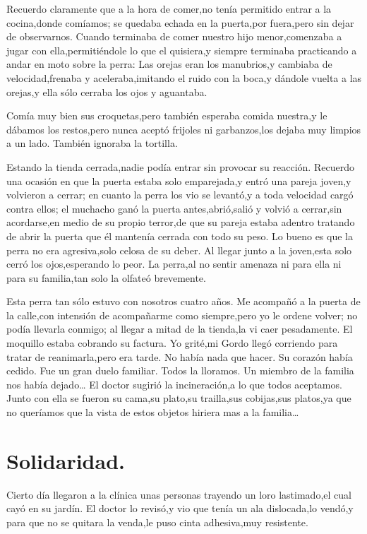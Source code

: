 \documentclass[letterpaper,12pt]{book}
\begin{document}
Recuerdo claramente que a la hora de comer,no tenía permitido entrar a la cocina,donde comíamos; se quedaba echada en la puerta,por fuera,pero sin dejar de observarnos. Cuando terminaba de comer nuestro hijo menor,comenzaba a jugar con ella,permitiéndole lo que el quisiera,y siempre terminaba practicando a andar en moto sobre la perra: Las orejas eran los manubrios,y cambiaba de velocidad,frenaba y aceleraba,imitando el ruido con la boca,y dándole vuelta a las orejas,y ella sólo cerraba los ojos y aguantaba.

Comía muy bien sus croquetas,pero también esperaba comida nuestra,y le dábamos los restos,pero nunca aceptó frijoles ni garbanzos,los dejaba muy limpios a un lado. También ignoraba la tortilla.

Estando la tienda cerrada,nadie podía entrar sin provocar su reacción. Recuerdo una ocasión en que la puerta estaba solo emparejada,y entró una pareja joven,y volvieron a cerrar; en cuanto la perra los vio se levantó,y a toda velocidad cargó contra ellos; el muchacho ganó la puerta antes,abrió,salió y volvió a cerrar,sin acordarse,en medio de su propio terror,de que su pareja estaba adentro tratando de abrir la puerta que él mantenía cerrada con todo su peso. Lo bueno es que la perra no era agresiva,solo celosa de su deber. Al llegar junto a la joven,esta solo cerró los ojos,esperando lo peor. La perra,al no sentir amenaza ni para ella ni para su familia,tan solo la olfateó brevemente.

Esta perra tan sólo estuvo con nosotros cuatro años. Me acompañó a la puerta de la calle,con intensión de acompañarme como siempre,pero yo le ordene volver; no podía llevarla conmigo; al llegar a mitad de la tienda,la vi caer pesadamente. El moquillo estaba cobrando su factura. Yo grité,mi Gordo llegó corriendo para tratar de reanimarla,pero era tarde. No había nada que hacer. Su corazón había cedido. Fue un gran duelo familiar. Todos la lloramos. Un miembro de la familia nos había dejado\ldots
El doctor sugirió la incineración,a lo que todos aceptamos. Junto con ella se fueron su cama,su plato,su trailla,sus cobijas,sus platos,ya que no queríamos que la vista de estos objetos hiriera mas a la familia\ldots


\chapter{Solidaridad.}

Cierto día llegaron a la clínica unas personas trayendo un loro lastimado,el cual cayó en su jardín. El doctor lo revisó,y vio que tenía un ala dislocada,lo vendó,y para que no se quitara la venda,le puso cinta adhesiva,muy resistente. 
\end{document}
